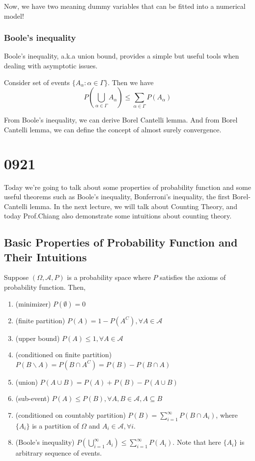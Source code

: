 \documentclass[11pt]{report}
\begin{document}
Now, we have two meaning dummy variables that can be fitted into a numerical model!

\subsection{Boole's inequality}
Boole's inequality, a.k.a union bound, provides a simple but useful tools when dealing with asymptotic issues.
\begin{theorem}
	Consider set of events $\{A_{\alpha}:\alpha\in\Gamma\}$. Then we have
	$$P(\bigcup_{\alpha\in\Gamma}A_{\alpha})\leq\sum_{\alpha\in\Gamma}P(A_{\alpha})$$
\end{theorem}

From Boole's inequality, we can derive Borel Cantelli lemma. And from Borel Cantelli lemma, we can define the concept of almost surely convergence.

\chapter{0921}
Today we're going to talk about some properties of probability function and some useful theorems such as Boole's inequality, Bonferroni's inequality, the first Borel-Cantelli lemma. In the next lecture, we will talk about Counting Theory, and today Prof.Chiang also demonstrate some intuitions about counting theory.

\section{Basic Properties of Probability Function and Their Intuitions}
\begin{theorem}
	Suppose $(\Omega,\mathcal{A},P)$ is a probability space where $P$ satisfies the axioms of probability function. Then,
	\begin{enumerate}
		\item (minimizer) $P(\emptyset) = 0$
		\item (finite partition) $P(A) = 1-P(A^C), \forall A\in\mathcal{A}$
		\item (upper bound) $P(A)\leq1, \forall A\in\mathcal{A}$
		\item (conditioned on finite partition) $P(B\backslash A) = P(B\cap A^C) = P(B) - P(B\cap A)$
		\item (union) $P(A\cup B) = P(A) + P(B) - P(A\cup B)$
		\item (sub-event) $P(A)\leq P(B),\forall A,B\in\mathcal{A},A\subseteq B$
		\item (conditioned on countably partition) $P(B) = \sum_{i=1}^{\infty} P(B\cap A_i)$, where $\{A_i\}$ is a partition of $\Omega$ and $A_i\in\mathcal{A},\forall i$.
		\item (Boole's inequality) $P(\bigcup_{i=1}^{\infty}A_i)\leq\sum_{i=1}^{\infty}P(A_i)$. Note that here $\{A_i\}$ is arbitrary sequence of events.
	\end{enumerate}
\end{theorem}
\end{document}
